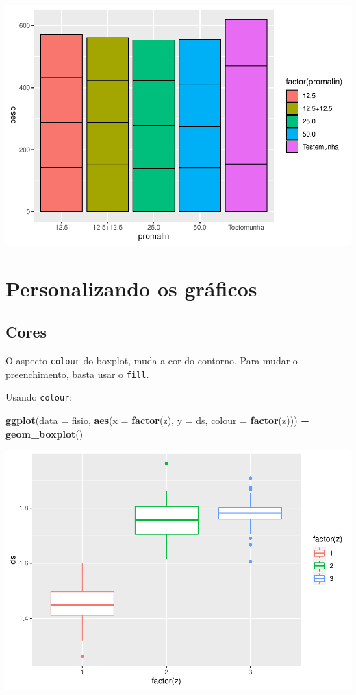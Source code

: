 \documentclass[
]{book}
\newenvironment{Shaded}{\begin{snugshade}}{\end{snugshade}}
\newcommand{\DataTypeTok}[1]{\textcolor[rgb]{0.13,0.29,0.53}{#1}}
\newcommand{\KeywordTok}[1]{\textcolor[rgb]{0.13,0.29,0.53}{\textbf{#1}}}
\newcommand{\NormalTok}[1]{#1}
\newcommand{\OperatorTok}[1]{\textcolor[rgb]{0.81,0.36,0.00}{\textbf{#1}}}
\newcommand{\StringTok}[1]{\textcolor[rgb]{0.31,0.60,0.02}{#1}}
\begin{document}
\includegraphics{TudodoR_files/figure-latex/unnamed-chunk-199-1.pdf}

\hypertarget{personalizando-os-gruxe1ficos-1}{%
\section{Personalizando os gráficos}\label{personalizando-os-gruxe1ficos-1}}

\hypertarget{cores-1}{%
\subsection{Cores}\label{cores-1}}

O aspecto \texttt{colour} do boxplot, muda a cor do contorno. Para mudar o preenchimento, basta usar o \texttt{fill}.

Usando \texttt{colour}:

\begin{Shaded}
\begin{Highlighting}[]
\KeywordTok{ggplot}\NormalTok{(}\DataTypeTok{data =}\NormalTok{ fisio, }\KeywordTok{aes}\NormalTok{(}\DataTypeTok{x =} \KeywordTok{factor}\NormalTok{(z), }\DataTypeTok{y =}\NormalTok{ ds, }\DataTypeTok{colour =} \KeywordTok{factor}\NormalTok{(z))) }\OperatorTok{+}
\StringTok{  }\KeywordTok{geom_boxplot}\NormalTok{()}
\end{Highlighting}
\end{Shaded}

\includegraphics{TudodoR_files/figure-latex/unnamed-chunk-200-1.pdf}
\end{document}
